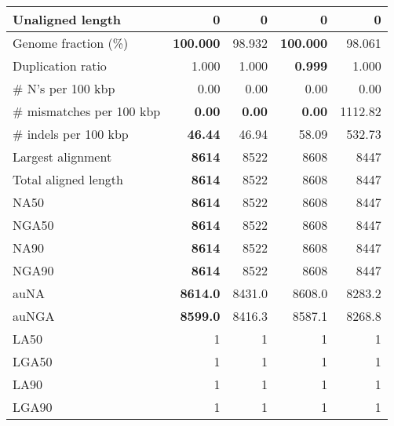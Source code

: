 \documentclass[12pt,a4paper]{article}
\begin{document}
\begin{table}[ht]
\begin{center}
\begin{tabular}{|l*{4}{|r}|}
Unaligned length & 0 & 0 & 0 & 0 \\ \hline
Genome fraction (\%) & {\bf 100.000} & 98.932 & {\bf 100.000} & 98.061 \\ \hline
Duplication ratio & 1.000 & 1.000 & {\bf 0.999} & 1.000 \\ \hline
\# N's per 100 kbp & 0.00 & 0.00 & 0.00 & 0.00 \\ \hline
\# mismatches per 100 kbp & {\bf 0.00} & {\bf 0.00} & {\bf 0.00} & 1112.82 \\ \hline
\# indels per 100 kbp & {\bf 46.44} & 46.94 & 58.09 & 532.73 \\ \hline
Largest alignment & {\bf 8614} & 8522 & 8608 & 8447 \\ \hline
Total aligned length & {\bf 8614} & 8522 & 8608 & 8447 \\ \hline
NA50 & {\bf 8614} & 8522 & 8608 & 8447 \\ \hline
NGA50 & {\bf 8614} & 8522 & 8608 & 8447 \\ \hline
NA90 & {\bf 8614} & 8522 & 8608 & 8447 \\ \hline
NGA90 & {\bf 8614} & 8522 & 8608 & 8447 \\ \hline
auNA & {\bf 8614.0} & 8431.0 & 8608.0 & 8283.2 \\ \hline
auNGA & {\bf 8599.0} & 8416.3 & 8587.1 & 8268.8 \\ \hline
LA50 & 1 & 1 & 1 & 1 \\ \hline
LGA50 & 1 & 1 & 1 & 1 \\ \hline
LA90 & 1 & 1 & 1 & 1 \\ \hline
LGA90 & 1 & 1 & 1 & 1 \\ \hline
\end{tabular}
\end{center}
\end{table}
\end{document}
